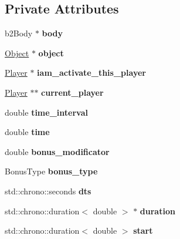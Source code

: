 \subsection*{Private Attributes}
\begin{DoxyCompactItemize}
\item 
\mbox{\label{class_bonus_a0c3f3fe18e7d7df28ab12fe2c023d3ff}} 
b2\+Body $\ast$ {\bfseries body}
\item 
\mbox{\label{class_bonus_a7493d5e3afda12e197c5505a66a1c7a1}} 
\hyperlink{class_object}{Object} $\ast$ {\bfseries object}
\item 
\mbox{\label{class_bonus_a5c03f6529a87fd393efaedb0db7e8b49}} 
\hyperlink{class_player}{Player} $\ast$ {\bfseries iam\+\_\+activate\+\_\+this\+\_\+player}
\item 
\mbox{\label{class_bonus_ad5b0534727679d924f60eeaef2ac988d}} 
\hyperlink{class_player}{Player} $\ast$$\ast$ {\bfseries current\+\_\+player}
\item 
\mbox{\label{class_bonus_a4a5cd25b27a40406d018e1e3e651d21f}} 
double {\bfseries time\+\_\+interval}
\item 
\mbox{\label{class_bonus_a7af3e40f87206d34e4689f53e37733b3}} 
double {\bfseries time}
\item 
\mbox{\label{class_bonus_a55548c98a8969d5994fbbcbdd6f35752}} 
double {\bfseries bonus\+\_\+modificator}
\item 
\mbox{\label{class_bonus_a3e8678940c7ea4679428e78874d92117}} 
Bonus\+Type {\bfseries bonus\+\_\+type}
\item 
\mbox{\label{class_bonus_a07620733fe137be73855a2ac4353771c}} 
std\+::chrono\+::seconds {\bfseries dts}
\item 
\mbox{\label{class_bonus_a98befe64efce3a1c5c93f2d694ea1abc}} 
std\+::chrono\+::duration$<$ double $>$ $\ast$ {\bfseries duration}
\item 
\mbox{\label{class_bonus_a288adde51bbfb1c9a22fc0cad3e5e8b0}} 
std\+::chrono\+::duration$<$ double $>$ {\bfseries start}
\end{DoxyCompactItemize}


